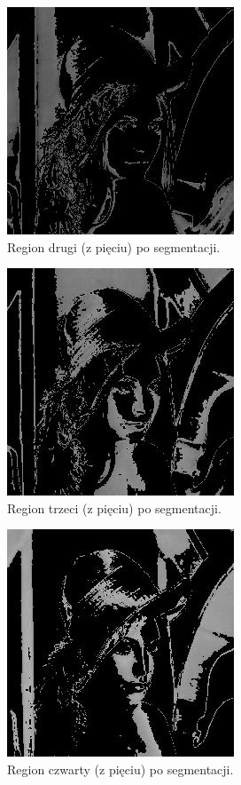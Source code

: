 \documentclass[10pt]{llncs}
\begin{document}
\begin{figure}[h!]
  \centering
  \includegraphics[scale=.8, clip]{img/02_region_02.jpg}
	\caption[]
  {Region drugi (z pięciu) po segmentacji.}
\end{figure}

\FloatBarrier

\begin{figure}[h!]
  \centering
  \includegraphics[scale=.8, clip]{img/02_region_03.jpg}
	\caption[]
  {Region trzeci (z pięciu) po segmentacji.}
\end{figure}

\FloatBarrier

\begin{figure}[h!]
  \centering
  \includegraphics[scale=.8, clip]{img/02_region_04.jpg}
	\caption[]
  {Region czwarty (z pięciu) po segmentacji.}
\end{figure}
\end{document}
